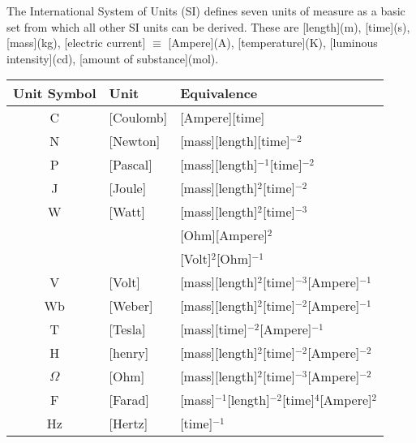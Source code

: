 \newpage
\begin{fancybox}{}
	The International System of Units (SI) defines seven units of measure as a basic set from which all other SI units can be derived. These are [length](m), [time](s), [mass](kg), [electric current] $\equiv$ [Ampere](A), [temperature](K), [luminous intensity](cd), [amount of substance](mol).
	\begin{center}
		\begin{tabular}{c|l|l}
			Unit Symbol & Unit & Equivalence \\
			\hline
			C & [Coulomb] & [Ampere][time] \\
			N & [Newton] & [mass][length][time]$^{-2}$ \\
			P & [Pascal]  & [mass][length]$^{-1}$[time]$^{-2}$ \\
			J & [Joule]  & [mass][length]$^{2}$[time]$^{-2}$ \\
			W & [Watt]  & [mass][length]$^{2}$[time]$^{-3}$ \\
			 & & [Ohm][Ampere]$^2$ \\
			 & & [Volt]$^2$[Ohm]$^{-1}$ \\
			V & [Volt]  & [mass][length]$^{2}$[time]$^{-3}$[Ampere]$^{-1}$ \\
			Wb & [Weber]  & [mass][length]$^{2}$[time]$^{-2}$[Ampere]$^{-1}$ \\
			T & [Tesla]  & [mass][time]$^{-2}$[Ampere]$^{-1}$ \\
			H & [henry]  & [mass][length]$^{2}$[time]$^{-2}$[Ampere]$^{-2}$ \\
			$\Omega$ & [Ohm]  & [mass][length]$^{2}$[time]$^{-3}$[Ampere]$^{-2}$ \\
			F & [Farad]  & [mass]$^{-1}$[length]$^{-2}$[time]$^{4}$[Ampere]$^{2}$ \\
			Hz & [Hertz]  & [time]$^{-1}$ 
		\end{tabular}
	\end{center}
\end{fancybox}


